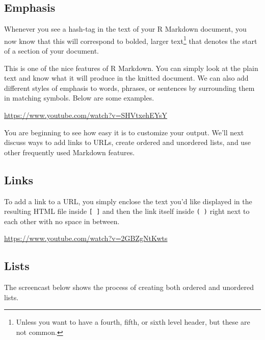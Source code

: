 \documentclass[]{tufte-book}
\begin{document}
\subsection{Emphasis}\label{emphasis}

Whenever you see a hash-tag in the text of your R Markdown document, you now know that this will correspond to bolded, larger text\footnote{Unless you want to have a fourth, fifth, or sixth level header, but these are not common.} that denotes the start of a section of your document.

This is one of the nice features of R Markdown. You can simply look at the plain text and know what it will produce in the knitted document. We can also add different styles of emphasis to words, phrases, or sentences by surrounding them in matching symbols. Below are some examples.

\vspace{0.1in}\begin{center}\footnotesize{\url{https://www.youtube.com/watch?v=SHVtxehEYsY}}\end{center}\vspace{0.1in}

You are beginning to see how easy it is to customize your output. We'll next discuss ways to add links to URLs, create ordered and unordered lists, and use other frequently used Markdown features.

\subsection{Links}\label{links}

To add a link to a URL, you simply enclose the text you'd like displayed in the resulting HTML file inside \texttt{{[}\ {]}} and then the link itself inside \texttt{(\ )} right next to each other with no space in between.

\vspace{0.1in}\begin{center}\footnotesize{\url{https://www.youtube.com/watch?v=2GBZgNtKwts}}\end{center}\vspace{0.1in}

\subsection{Lists}\label{lists}

The screencast below shows the process of creating both ordered and unordered lists.
\end{document}
